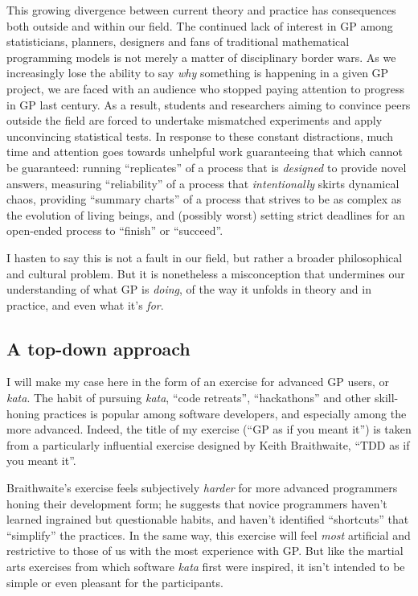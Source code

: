 This growing divergence between current theory and practice has consequences both outside and within our field. The continued lack of interest in GP among statisticians, planners, designers and fans of traditional mathematical programming models is not merely a matter of disciplinary border wars. As we increasingly lose the ability to say \emph{why} something is happening in a given GP project, we are faced with an audience who stopped paying attention to progress in GP last century. As a result, students and researchers aiming to convince peers outside the field are forced to undertake mismatched experiments and apply unconvincing statistical tests. In response to these constant distractions, much time and attention goes towards unhelpful work guaranteeing that which cannot be guaranteed: running ``replicates'' of a process that is \emph{designed} to provide novel answers, measuring ``reliability'' of a process that \emph{intentionally} skirts dynamical chaos, providing ``summary charts'' of a process that strives to be as complex as the evolution of living beings, and (possibly worst) setting strict deadlines for an open-ended process to ``finish'' or ``succeed''.

I hasten to say this is not a fault in our field, but rather a broader philosophical and cultural problem. But it is nonetheless a misconception that undermines our understanding of what GP is \emph{doing}, of the way it unfolds in theory and in practice, and even what it's \emph{for}.

\subsection{A top-down approach}\hypertarget{a-top-down-approach}{}\label{a-top-down-approach}

I will make my case here in the form of an exercise for advanced GP users, or \emph{kata}. The habit of pursuing \emph{kata}, ``code retreats'', ``hackathons'' and other skill-honing practices is popular among software developers, and especially among the more advanced. Indeed, the title of my exercise (``GP as if you meant it'') is taken from a particularly influential exercise designed by Keith Braithwaite, ``TDD as if you meant it''.

Braithwaite's exercise feels subjectively \emph{harder} for more advanced programmers honing their development form; he suggests that novice programmers haven't learned ingrained but questionable habits, and haven't identified ``shortcuts'' that ``simplify'' the practices. In the same way, this exercise will feel \emph{most} artificial and restrictive to those of us with the most experience with GP. But like the martial arts exercises from which software \emph{kata} first were inspired, it isn't intended to be simple or even pleasant for the participants.

